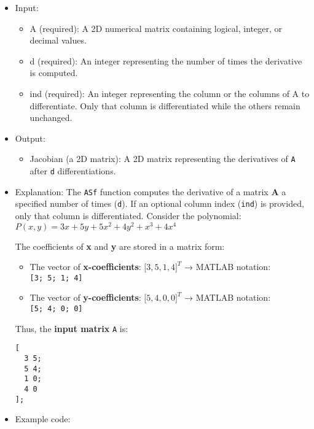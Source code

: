 \documentclass[11pt]{amsart}
\theoremstyle{remark}
\providecommand{\tightlist}{%
  \setlength{\itemsep}{0pt}\setlength{\parskip}{0pt}}
\theoremstyle{definition}
\theoremstyle{remark}
\numberwithin{equation}{section}
\begin{document}
\begin{itemize}
\item
  Input:

  \begin{itemize}
  \tightlist
  \item
    A (required): A 2D numerical matrix containing logical, integer, or
    decimal values.\\
  \item
    d (required): An integer representing the number of times the
    derivative is computed.\\
  \item
    ind (required): An integer representing the column or the columns of
    A to differentiate. Only that column is differentiated while the
    others remain unchanged.
  \end{itemize}
\item
  Output:

  \begin{itemize}
  \tightlist
  \item
    Jacobian (a 2D matrix): A 2D matrix representing the derivatives of
    \texttt{A} after \texttt{d} differentiations.
  \end{itemize}
\item
  Explanation: The \texttt{ASf} function computes the derivative of a
  matrix \textbf{A} a specified number of times (\texttt{d}). If an
  optional column index (\texttt{ind}) is provided, only that column is
  differentiated. Consider the polynomial: $P(x, y) = 3x + 5y + 5x^2 + 4y^2
  + x^3 + 4x^4$

  The coefficients of \textbf{x} and \textbf{y} are stored in a matrix
  form:

  \begin{itemize}
  \tightlist
  \item
    The vector of \textbf{x-coefficients}: ${[}3, 5, 1, 4{]}^T$ → MATLAB
    notation: \texttt{{[}3;\ 5;\ 1;\ 4{]}}
  \item
    The vector of \textbf{y-coefficients}: ${[}5, 4, 0, 0{]}^T$ → MATLAB
    notation: \texttt{{[}5;\ 4;\ 0;\ 0{]}}
  \end{itemize}

  Thus, the \textbf{input matrix} \texttt{A} is:

\begin{verbatim}
[
  3 5;
  5 4;
  1 0;
  4 0
];
\end{verbatim}
\item
  Example code:


\end{itemize}
\end{document}
